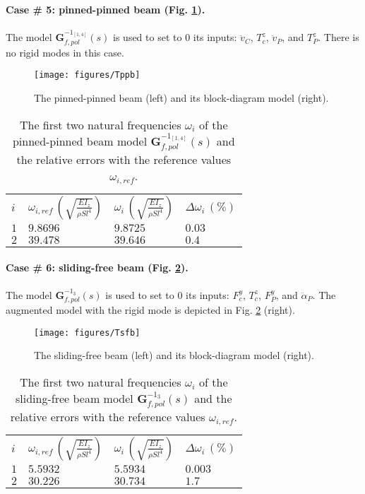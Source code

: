 \paragraph{Case \# 5: pinned-pinned beam (Fig. \ref{fig:Tpp}).} The model $\mathbf{G}_{f,pol}^{-1_{[1,4]}}(s)$ is used to set to $0$ its inputs: $\ddot{v}_C$, $T^z_c$, $\ddot{v}_P$, and $T^z_P$. There is no rigid modes in this case.
\begin{figure}[htbp!]
  \texttt{[image: figures/Tppb]}
\caption{The pinned-pinned beam (left) and its block-diagram model (right).}
\label{fig:Tpp} 
\end{figure}
\begin{table}[htbp!]
\caption{The first two natural frequencies $\omega_i$ of the pinned-pinned beam model $\mathbf{G}_{f,pol}^{-1_{[1,4]}}(s)$ and the relative errors with the reference values $\omega_{i,ref}$.}
\label{tab:Tpp}       %
\begin{tabular}{llll}
\hline\noalign{\smallskip}
  $i$ & $\omega_{i,ref}\,\left(\sqrt{\frac{EI_z}{\rho S l^4}}\right)$ &  $\omega_i\,\left(\sqrt{\frac{EI_z}{\rho S l^4}}\right)$ &  $\Delta \omega_i\,(\%)$ \\
\noalign{\smallskip}\hline\noalign{\smallskip}
$1$ & $9.8696$ & $9.8725$  & $0.03$ \\ 
$2$ & $39.478$ & $39.646$ & $0.4$ \\
\hline
\end{tabular}
\end{table}

\FloatBarrier
\paragraph{Case \# 6: sliding-free beam (Fig. \ref{fig:Tsf}).} The model $\mathbf{G}_{f,pol}^{-1_{3}}(s)$ is used to set to $0$ its inputs: $F^y_c$, $T^z_c$, $F^y_P$, and $\ddot{\alpha}_P$. The augmented model with the rigid mode is depicted in Fig. \ref{fig:Tsf} (right).
\begin{figure}[htbp!]
  \texttt{[image: figures/Tsfb]}
\caption{The sliding-free beam (left) and its block-diagram model (right).}
\label{fig:Tsf} 
\end{figure}
\begin{table}[htbp!]
\caption{The first two natural frequencies $\omega_i$ of the sliding-free beam model $\mathbf{G}_{f,pol}^{-1_{3}}(s)$ and the relative errors with the reference values $\omega_{i,ref}$.}
\label{tab:Tsf}       %
\begin{tabular}{llll}
\hline\noalign{\smallskip}
  $i$ & $\omega_{i,ref}\,\left(\sqrt{\frac{EI_z}{\rho S l^4}}\right)$ &  $\omega_i\,\left(\sqrt{\frac{EI_z}{\rho S l^4}}\right)$ &  $\Delta \omega_i\,(\%)$ \\
\noalign{\smallskip}\hline\noalign{\smallskip}
$1$ & $5.5932$ & $5.5934$  & $0.003$ \\ 
$2$ & $30.226$ & $30.734$ & $1.7$ \\
\hline
\end{tabular}
\end{table}

